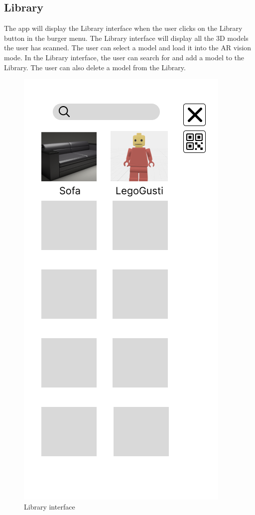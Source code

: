 \subsection{Library}
The app will display the Library interface when the user clicks on the Library button in the burger menu. The Library interface will display all the \ac{3D} models the user has scanned. The user can select a model and load it into the \ac{AR} vision mode. In the Library interface, the user can search for and add a model to the Library. The user can also delete a model from the Library.
\begin{figure}[h!]
    \begin{center}
        \includegraphics[scale=0.5]{img/App_mock/iPhone 14 - 10.png}
        \caption{Library interface}
        \label{fig:library}
    \end{center}
\end{figure}
\pagebreak

